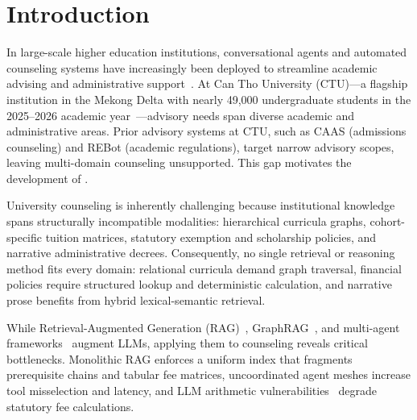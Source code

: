 \section{Introduction}
\label{sec:intro}

In large-scale higher education institutions, conversational agents and automated counseling systems have increasingly been deployed to streamline academic advising and administrative support~\cite{wollny2021chatbots}. At Can Tho University (CTU)—a flagship institution in the Mekong Delta with nearly 49,000 undergraduate students in the 2025--2026 academic year~\cite{ctu2022handbook}—advisory needs span diverse academic and administrative areas. Prior advisory systems at CTU, such as CAAS (admissions counseling) and REBot (academic regulations), target narrow advisory scopes, leaving multi-domain counseling unsupported. This gap motivates the development of \system{}.

University counseling is inherently challenging because institutional knowledge spans structurally incompatible modalities: hierarchical curricula graphs, cohort-specific tuition matrices, statutory exemption and scholarship policies, and narrative administrative decrees. Consequently, no single retrieval or reasoning method fits every domain: relational curricula demand graph traversal, financial policies require structured lookup and deterministic calculation, and narrative prose benefits from hybrid lexical-semantic retrieval.

While Retrieval-Augmented Generation (RAG)~\cite{lewis2020rag,gao2023rag_survey}, GraphRAG~\cite{edge2024graphrag}, and multi-agent frameworks~\cite{yao2023react,wu2023autogen,schick2023toolformer} augment LLMs, applying them to counseling reveals critical bottlenecks. Monolithic RAG enforces a uniform index that fragments prerequisite chains and tabular fee matrices, uncoordinated agent meshes increase tool misselection and latency, and LLM arithmetic vulnerabilities~\cite{qian2023limitations} degrade statutory fee calculations.

